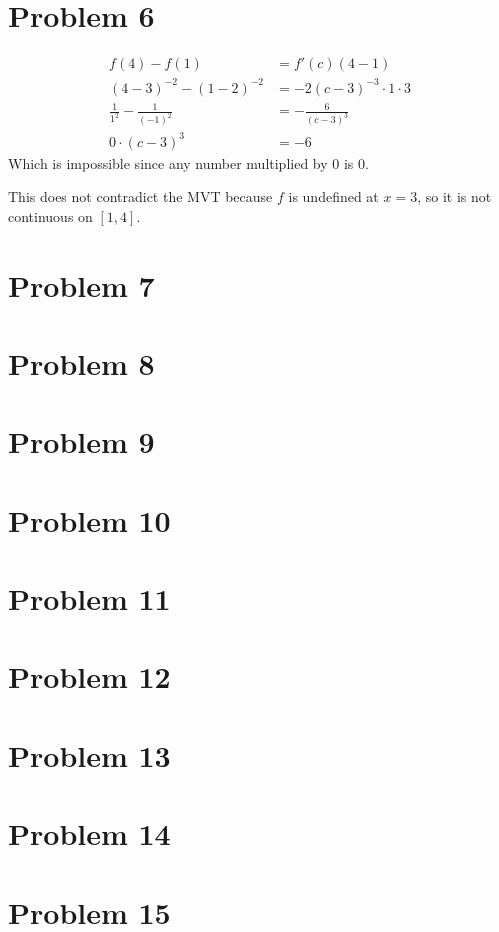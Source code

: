 \documentclass{article}
\newcommand*{\problem}[1]{\section*{Problem #1}}
\begin{document}
\problem{6}
\begin{align*}
	f(4)-f(1)&=f'(c)(4-1) \\
	(4-3)^{-2}-(1-2)^{-2}&=-2(c-3)^{-3}\cdot1\cdot3 \\
	\frac{1}{1^2}-\frac{1}{(-1)^2}&=-\frac{6}{(c-3)^3} \\
	0\cdot(c-3)^3&=-6
\end{align*}
Which is impossible since any number multiplied by $0$ is $0$.

This does not contradict the MVT because $f$ is undefined at $x=3$, so it is not continuous on $[1,4]$.

\problem{7}


\problem{8}


\problem{9}


\problem{10}


\problem{11}


\problem{12}


\problem{13}


\problem{14}


\problem{15}
\end{document}
